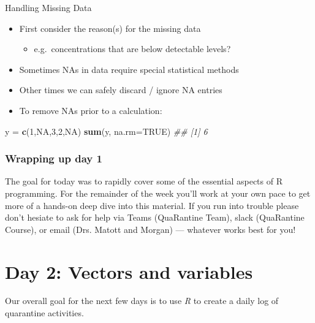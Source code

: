 \documentclass[
]{book}
\newenvironment{Shaded}{\begin{snugshade}}{\end{snugshade}}
\newcommand{\CommentTok}[1]{\textcolor[rgb]{0.56,0.35,0.01}{\textit{#1}}}
\newcommand{\DataTypeTok}[1]{\textcolor[rgb]{0.13,0.29,0.53}{#1}}
\newcommand{\DecValTok}[1]{\textcolor[rgb]{0.00,0.00,0.81}{#1}}
\newcommand{\KeywordTok}[1]{\textcolor[rgb]{0.13,0.29,0.53}{\textbf{#1}}}
\newcommand{\NormalTok}[1]{#1}
\newcommand{\OtherTok}[1]{\textcolor[rgb]{0.56,0.35,0.01}{#1}}
\newcommand{\StringTok}[1]{\textcolor[rgb]{0.31,0.60,0.02}{#1}}
\providecommand{\tightlist}{%
  \setlength{\itemsep}{0pt}\setlength{\parskip}{0pt}}
\begin{document}
Handling Missing Data

\begin{itemize}
\tightlist
\item
  First consider the reason(s) for the missing data

  \begin{itemize}
  \tightlist
  \item
    e.g.~concentrations that are below detectable levels?
  \end{itemize}
\item
  Sometimes NAs in data require special statistical methods
\item
  Other times we can safely discard / ignore NA entries
\item
  To remove NAs prior to a calculation:
\end{itemize}

\begin{Shaded}
\begin{Highlighting}[]
\NormalTok{y =}\StringTok{ }\KeywordTok{c}\NormalTok{(}\DecValTok{1}\NormalTok{,}\OtherTok{NA}\NormalTok{,}\DecValTok{3}\NormalTok{,}\DecValTok{2}\NormalTok{,}\OtherTok{NA}\NormalTok{)}
\KeywordTok{sum}\NormalTok{(y, }\DataTypeTok{na.rm=}\OtherTok{TRUE}\NormalTok{)}
\CommentTok{## [1] 6}
\end{Highlighting}
\end{Shaded}

\hypertarget{wrapping-up-day-1}{%
\subsubsection*{Wrapping up day 1}\label{wrapping-up-day-1}}

The goal for today was to rapidly cover some of the essential aspects of R programming. For the remainder of the week you'll work at your own pace to get more of a hands-on deep dive into this material. If you run into trouble please don't hesiate to ask for help via Teams (QuaRantine Team), slack (QuaRantine Course), or email (Drs. Matott and Morgan) --- whatever works best for you!

\hypertarget{day-2-vectors-and-variables}{%
\section{Day 2: Vectors and variables}\label{day-2-vectors-and-variables}}

Our overall goal for the next few days is to use \emph{R} to create a daily log of quarantine activities.
\end{document}
